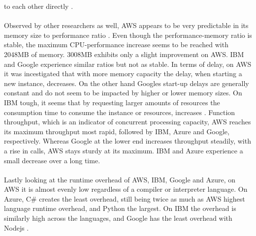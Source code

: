 \documentclass[a4paper,twoside,11pt, pagesize]{scrartcl}
\begin{document}
to each other directly \cite{manner2018cold}.\\\\ Observed by other researchers as well, AWS appears to be very predictable in its memory size to performance ratio \cite{pawlik2019performance}. Even though the performance-memory ratio is stable, the maximum CPU-performance increase seems to be reached with 2048MB of memory. 3008MB exhibits only a slight improvement on AWS. IBM and Google experience similar ratios but not as stable. In terms of delay, on AWS it was incestigated that with more memory capacity the delay, when starting a new instance, decreases. On the other hand Googles start-up delays are generally constant and do not seem to be impacted by higher or lower memory sizes. On IBM tough, it seems that by requesting larger amounts of resources the consumption time to consume the instance or resources, increases \cite{pawlik2019performance}. Function throughput, which is an indicator of concurrent processing capacity, AWS reaches its maximum throughput most rapid, followed by IBM, Azure and Google, respectively. Whereas Google at the lower end increases throughput steadily, with a rise in calls, AWS stays sturdy at its maximum. IBM and Azure experience a small decrease over a long time.\\\\ Lastly looking at the runtime overhead of AWS, IBM, Google and Azure, on AWS it is almost evenly low regardless of a compiler or interpreter language. On Azure, C\# creates the least overhead, still being twice as much as AWS highest language runtime overhead, and Python the largest. On IBM the overhead is similarly high across the languages, and Google has the least overhead with Nodejs \cite{pawlik2019performance}.\\\\ 
\end{document}
